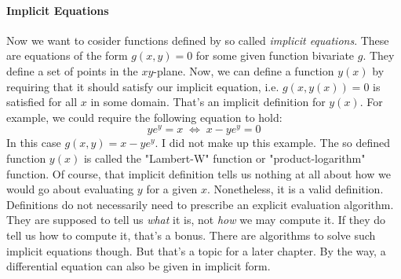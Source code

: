 
\paragraph{Implicit Equations}
Now we want to cosider functions defined by so called \emph{implicit equations}. These are equations of the form $g(x,y) = 0$ for some given function bivariate $g$. They define a set of points in the $xy$-plane. Now, we can define a function $y(x)$ by requiring that it should satisfy our implicit equation, i.e. $g(x,y(x)) = 0$ is satisfied for all $x$ in some domain. That's an implicit definition for $y(x)$. For example, we could require the following equation to hold:
\begin{equation}
 y e^y = x \;  \Leftrightarrow \; x - y e^y = 0 
\end{equation}
In this case $g(x,y) = x - y e^y$. I did not make up this example. The so defined function $y(x)$ is called the "Lambert-W" function or "product-logarithm" function. Of course, that implicit definition tells us nothing at all about how we would go about evaluating $y$ for a given $x$. Nonetheless, it is a valid definition. Definitions do not necessarily need to prescribe an explicit evaluation algorithm. They are supposed to tell us \emph{what} it is, not \emph{how} we may compute it. If they do tell us how to compute it, that's a bonus. There are algorithms to solve such implicit equations though. But that's a topic for a later chapter. By the way, a differential equation can also be given in implicit form.



